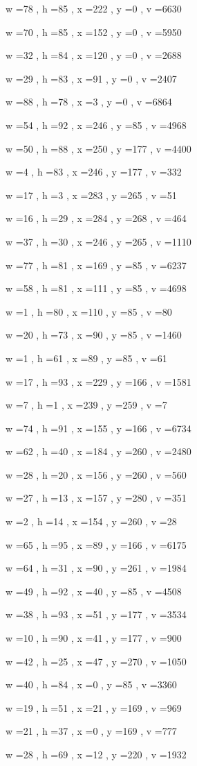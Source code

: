 \documentclass[11pt]{article}
\begin{document}
w =78 , h =85 , x =222 , y =0 , v =6630
\par
w =70 , h =85 , x =152 , y =0 , v =5950
\par
w =32 , h =84 , x =120 , y =0 , v =2688
\par
w =29 , h =83 , x =91 , y =0 , v =2407
\par
w =88 , h =78 , x =3 , y =0 , v =6864
\par
w =54 , h =92 , x =246 , y =85 , v =4968
\par
w =50 , h =88 , x =250 , y =177 , v =4400
\par
w =4 , h =83 , x =246 , y =177 , v =332
\par
w =17 , h =3 , x =283 , y =265 , v =51
\par
w =16 , h =29 , x =284 , y =268 , v =464
\par
w =37 , h =30 , x =246 , y =265 , v =1110
\par
w =77 , h =81 , x =169 , y =85 , v =6237
\par
w =58 , h =81 , x =111 , y =85 , v =4698
\par
w =1 , h =80 , x =110 , y =85 , v =80
\par
w =20 , h =73 , x =90 , y =85 , v =1460
\par
w =1 , h =61 , x =89 , y =85 , v =61
\par
w =17 , h =93 , x =229 , y =166 , v =1581
\par
w =7 , h =1 , x =239 , y =259 , v =7
\par
w =74 , h =91 , x =155 , y =166 , v =6734
\par
w =62 , h =40 , x =184 , y =260 , v =2480
\par
w =28 , h =20 , x =156 , y =260 , v =560
\par
w =27 , h =13 , x =157 , y =280 , v =351
\par
w =2 , h =14 , x =154 , y =260 , v =28
\par
w =65 , h =95 , x =89 , y =166 , v =6175
\par
w =64 , h =31 , x =90 , y =261 , v =1984
\par
w =49 , h =92 , x =40 , y =85 , v =4508
\par
w =38 , h =93 , x =51 , y =177 , v =3534
\par
w =10 , h =90 , x =41 , y =177 , v =900
\par
w =42 , h =25 , x =47 , y =270 , v =1050
\par
w =40 , h =84 , x =0 , y =85 , v =3360
\par
w =19 , h =51 , x =21 , y =169 , v =969
\par
w =21 , h =37 , x =0 , y =169 , v =777
\par
w =28 , h =69 , x =12 , y =220 , v =1932
\par
\newpage
\end{document}

